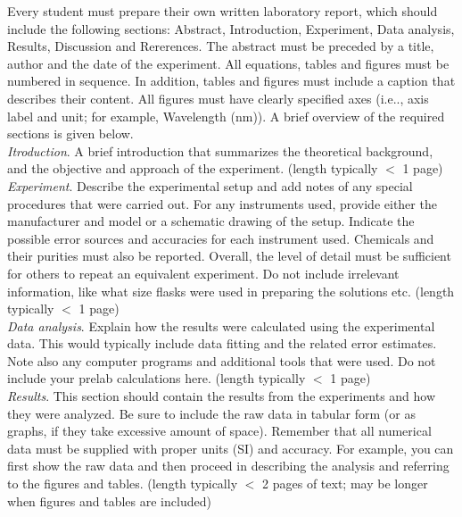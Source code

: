 \documentclass[byrevtex,amssymb,aps,pra,floatfix,letterpaper]{revtex4}
\begin{document}
Every student must prepare their own written laboratory report, which should include the following sections: Abstract, Introduction, Experiment, Data analysis, Results, Discussion and Rererences. The abstract must be preceded by a title, author and the date of the experiment. All equations, tables and figures must be numbered in sequence. In addition, tables and figures must include a caption that describes their content. All figures must have clearly specified axes (i.e.., axis label and unit; for example, Wavelength (nm)). A brief overview of the required sections is given below.\\

\noindent
\textit{Itroduction}. A brief introduction that summarizes the theoretical background, and the objective
and approach of the experiment. (length typically $<$ 1 page)\\

\noindent
\textit{Experiment}. Describe the experimental setup and add notes of any special procedures that were
carried out. For any instruments used, provide either the manufacturer and model or a schematic drawing of the setup. Indicate the possible error sources and accuracies for each instrument used. Chemicals and their purities must also be reported. Overall, the level of detail must be sufficient for others to repeat an equivalent experiment. Do not include irrelevant information, like what size flasks were used in preparing the solutions etc. (length typically $<$ 1 page)\\

\noindent
\textit{Data analysis}. Explain how the results were calculated using the experimental data. This would typically include data fitting and the related error estimates. Note also any computer programs and additional tools that were used. Do not include your prelab calculations here. (length typically $<$ 1 page)\\

\noindent
\textit{Results}. This section should contain the results from the experiments and how they were analyzed. Be sure to include the
raw data in tabular form (or as graphs, if they take excessive amount of space). Remember that all numerical data must be supplied with proper units (SI) and accuracy. For example, you can first show the raw data and then proceed in describing the analysis and referring to the figures and tables. (length typically $<$ 2 pages of text; may be longer when figures and tables are included)\\
\end{document}
